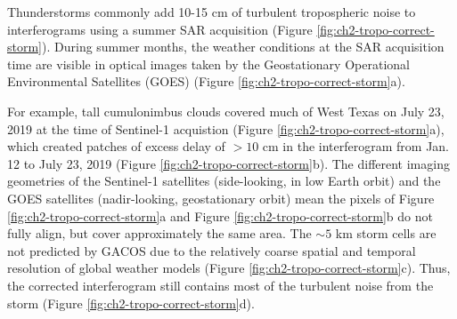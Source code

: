 Thunderstorms commonly add 10-15 cm of turbulent tropospheric noise to interferograms using a summer SAR acquisition (Figure \ref{fig:ch2-tropo-correct-storm}).
During summer months, 
the weather conditions at the SAR acquisition time are visible in optical images taken by the Geostationary Operational Environmental Satellites (GOES) (Figure \ref{fig:ch2-tropo-correct-storm}a).


For example, tall cumulonimbus clouds covered much of West Texas on July 23, 2019 at the time of Sentinel-1 acquistion (Figure \ref{fig:ch2-tropo-correct-storm}a), which created patches of excess delay of $>10$ cm in the interferogram from Jan. 12 to July 23, 2019 (Figure \ref{fig:ch2-tropo-correct-storm}b).
The different imaging geometries of the Sentinel-1 satellites (side-looking, in low Earth orbit) and the GOES satellites (nadir-looking, geostationary orbit) mean the pixels of Figure \ref{fig:ch2-tropo-correct-storm}a and Figure \ref{fig:ch2-tropo-correct-storm}b do not fully align, but cover approximately the same area.
The $\sim 5$ km storm cells are not predicted by GACOS due to the relatively coarse spatial and temporal resolution of global weather models (Figure \ref{fig:ch2-tropo-correct-storm}c). Thus, the corrected interferogram still contains most of the turbulent noise from the storm (Figure \ref{fig:ch2-tropo-correct-storm}d).


